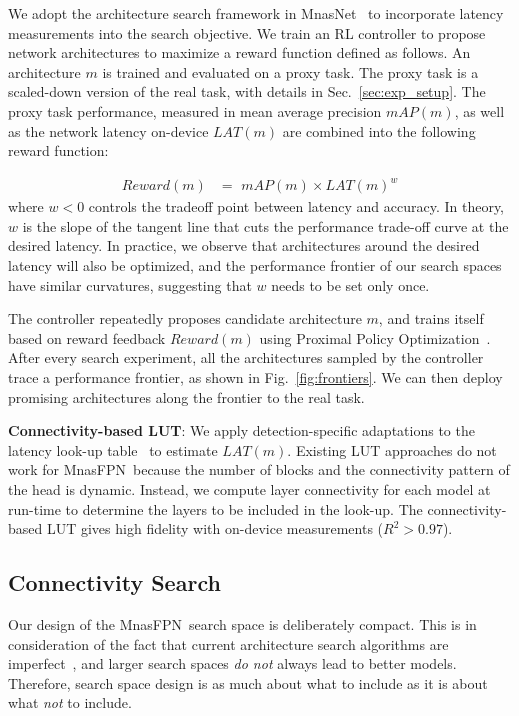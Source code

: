 \documentclass[10pt,twocolumn,letterpaper]{article}
\def\Mnasfpn{MnasFPN~}
\begin{document}
We adopt the architecture search framework in MnasNet~\cite{tan2019mnasnet} to incorporate latency measurements into the search objective. We train an RL controller to propose network architectures to maximize a reward function defined as follows. An architecture $m$ is trained and evaluated on a proxy task. The proxy task is a scaled-down version of the real task, with details in Sec.~\ref{sec:exp_setup}. The proxy task performance, measured in mean average precision $mAP(m)$, as well as the network latency on-device $LAT(m)$ are combined into the following reward function:

\begin{align}
    Reward(m) &= \,\,mAP(m) \times LAT(m)^w
    \label{eq:reward}
\end{align}
where $w < 0$ controls the tradeoff point between latency and accuracy. In theory, $w$ is the slope of the tangent line that cuts the performance trade-off curve at the desired latency. In practice, we observe that architectures around the desired latency will also be optimized, and the performance frontier of our search spaces have similar curvatures, suggesting that $w$ needs to be set only once.


The controller repeatedly proposes candidate architecture $m$, and trains itself based on reward feedback $Reward(m)$ using Proximal Policy Optimization~\cite{schulman2017proximal}. After every search experiment, all the  architectures sampled by the controller trace a performance frontier, as shown in Fig.~\ref{fig:frontiers}. We can then deploy promising architectures along the frontier to the real task.

{\bf Connectivity-based LUT}: We apply detection-specific adaptations to the latency look-up table~\cite{yang2018netadapt, tan2019mnasnet} to estimate $LAT(m)$. Existing LUT approaches do not work for \Mnasfpn because the number of blocks and the connectivity pattern of the head is dynamic. Instead, we compute layer connectivity for each model at run-time to determine the layers to be included in the look-up. The connectivity-based LUT gives high fidelity with on-device measurements ($R^2>0.97$).


\subsection{Connectivity Search}
\label{sec:conn}
Our design of the \Mnasfpn search space is deliberately compact. This is in consideration of the fact that current architecture search algorithms are imperfect~\cite{li2019random}, and larger search spaces {\it do not} always lead to better models. Therefore, search space design is as much about what to include as it is about what {\it not} to include. 
\end{document}
